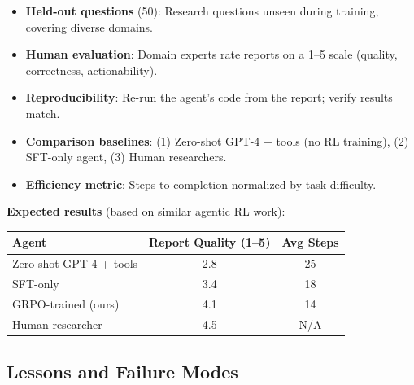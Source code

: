 \begin{keybox}
\begin{itemize}
  \item \textbf{Held-out questions} (50): Research questions unseen during training, covering diverse domains.
  \item \textbf{Human evaluation}: Domain experts rate reports on a 1--5 scale (quality, correctness, actionability).
  \item \textbf{Reproducibility}: Re-run the agent’s code from the report; verify results match.
  \item \textbf{Comparison baselines}: (1) Zero-shot GPT-4 + tools (no RL training), (2) SFT-only agent, (3) Human researchers.
  \item \textbf{Efficiency metric}: Steps-to-completion normalized by task difficulty.
\end{itemize}

\textbf{Expected results} (based on similar agentic RL work):

\begin{tabular}{@{}lcc@{}}
\toprule
\textbf{Agent} & \textbf{Report Quality (1--5)} & \textbf{Avg Steps} \\
\midrule
Zero-shot GPT-4 + tools & 2.8 & 25 \\
SFT-only & 3.4 & 18 \\
GRPO-trained (ours) & 4.1 & 14 \\
Human researcher & 4.5 & N/A \\
\bottomrule
\end{tabular}
\end{keybox}

\subsection{Lessons and Failure Modes}
\label{lessons-and-failure-modes}

